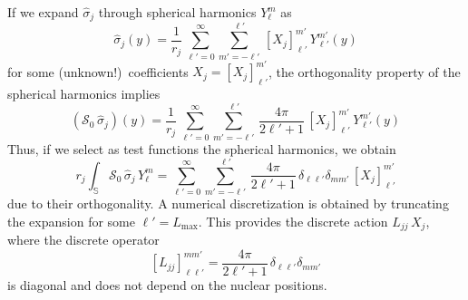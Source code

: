\documentclass[aip,jcp,a4paper,11pt]{revtex4-1}
\newcommand{\cS}{\mathcal{S}}
\begin{document}
If we expand $\hat{\sigma}_j$ through spherical harmonics $Y_\ell^m$ as
\[
\hat{\sigma}_j(y) = \frac{1}{r_j} \, \sum_{\ell'= 0}^{\infty} \sum_{m' = -\ell'}^{\ell'} \,  [X_j]_{\ell'}^{m'} \, Y_{\ell'}^{m'}(y)
\]
for some (unknown!)~coefficients $X_j = [X_j]_{\ell'}^{m'}$, the orthogonality property of the spherical harmonics implies
\[
(\cS_0 \, \hat{\sigma}_j)(y) = \frac{1}{r_j} \, \sum_{\ell'= 0}^{\infty} \sum_{m' = -\ell'}^{\ell'} \, \frac{4\pi}{2\ell' + 1}\, [X_j]_{\ell'}^{m'} \, Y_{\ell'}^{m'}(y)
\]
Thus, if we select as test functions the spherical harmonics, we obtain
\begin{equation*}%
r_j\int_\mathbb{S} \cS_0 \, \hat{\sigma}_j \, Y_\ell^m = \sum_{\ell'= 0}^{\infty} \sum_{m' = -\ell'}^{\ell'} \, \frac{4\pi}{2\ell' + 1} \, \delta_{\ell \ell'} \delta_{m m'}\, [X_j]_{\ell'}^{m'} 
\end{equation*}
due to their orthogonality. A numerical discretization is obtained by truncating the expansion for some $\ell'=L_\text{max}$. This provides the discrete action $L_{jj} \, X_j$, where the discrete operator
\begin{equation}\label{eq:61}
 [L_{jj}]_{\ell \ell'}^{m m'} =  \frac{4\pi}{2\ell' + 1} \, \delta_{\ell \ell'} \delta_{m m'}
\end{equation}
is diagonal and does not depend on the nuclear positions.
\end{document}
